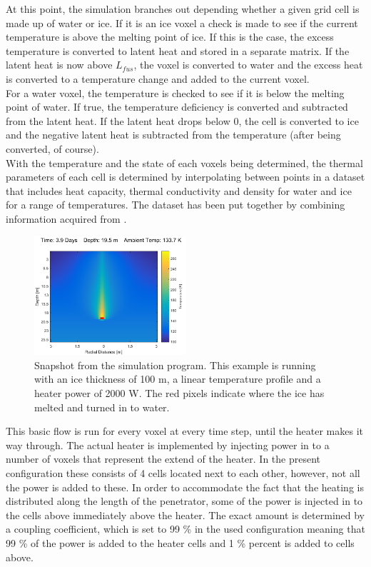 \noindent
At this point, the simulation branches out depending whether a given grid cell is made up of water or ice. If it is an ice voxel a check is made to see if the current temperature is above the melting point of ice. If this is the case, the excess temperature is converted to latent heat and stored in a separate matrix. If the latent heat is now above $L_{fus}$, the voxel is converted to water and the excess heat is converted to a temperature change and added to the current voxel.\\

\noindent
For a water voxel, the temperature is checked to see if it is below the melting point of water. If true, the temperature deficiency is converted and subtracted from the latent heat. If the latent heat drops below 0, the cell is converted to ice and the negative latent heat is subtracted from the temperature (after being converted, of course).\\

\noindent
With the temperature and the state of each voxels being determined, the thermal parameters of each cell is determined by interpolating between points in a dataset that includes heat capacity, thermal conductivity and density for water and ice for a range of temperatures. The dataset has been put together by combining information acquired from \cite{website:engineeringToolbox}.\\

 \begin{figure}[ht]
 	\centering
 	\includegraphics[width=0.5\textwidth]{figures/LAMC/snapshot.pdf}
 	\caption{Snapshot from the simulation program. This example is running with an ice thickness of 100 m, a linear temperature profile and a heater power of 2000 W. The red pixels indicate where the ice has melted and turned in to water.}
 	\label{fig:simSnapshot}
 \end{figure}

\noindent
This basic flow is run for every voxel at every time step, until the heater makes it way through. The actual heater is implemented by injecting power in to a number of voxels that represent the extend of the heater. In the present configuration these consists of 4 cells located next to each other, however, not all the power is added to these. In order to accommodate the fact that the heating is distributed along the length of the penetrator, some of the power is injected in to the cells above immediately above the heater. The exact amount is determined by a coupling coefficient, which is set to 99 \% in the used configuration meaning that 99 \% of the power is added to the heater cells and 1 \% percent is added to cells above. \\

